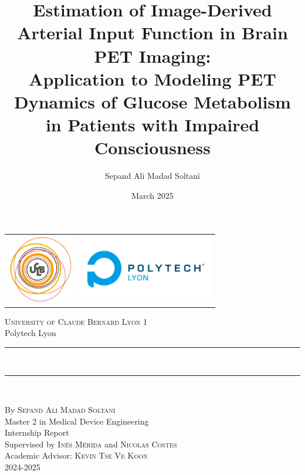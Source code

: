 \documentclass[a4paper,12pt,twoside,english,openany]{book}
\title{Estimation of Image-Derived Arterial Input Function in Brain PET Imaging: \\ Application to Modeling PET Dynamics of Glucose Metabolism in Patients with Impaired Consciousness}
\author{Sepand Ali Madad Soltani}
\date{March 2025}
\begin{document}
\begin{titlepage}
	\begin{center}
		\begin{tabular}{c@{\hskip 7cm}c@{\hskip 1cm}}
			\includegraphics[height=3cm]{res/ucbl.png} &
			\includegraphics[height=3cm]{res/polytech.png}
		\end{tabular}
	\end{center}

	\begin{center}

		\vspace*{.03\textheight}
		\textsc{\Large University of Claude Bernard Lyon 1}\\[0.2cm]
		\large Polytech Lyon

		\rule{\textwidth}{0.8pt} \\
		\vspace{10pt}

		{\Large \bfseries \thetitle}
		\rule{\textwidth}{0.8pt} \\

	\end{center}

	\vfill
	\begin{center}
		By \textsc{\Large Sepand Ali Madad Soltani}\\[1cm]
        Master 2 in Medical Device Engineering \\ 
		Internship Report\\[1.2cm]
		Supervised by \textsc{\large Inés Mérida}
		and
		\textsc{\large Nicolas Costes}  \\[0.2cm]
		Academic Advisor: \textsc{\large Kevin Tse Ve Koon}\\[0.2cm]
		2024-2025

	\end{center}

	\vspace{1cm}
\end{titlepage}
\end{document}
